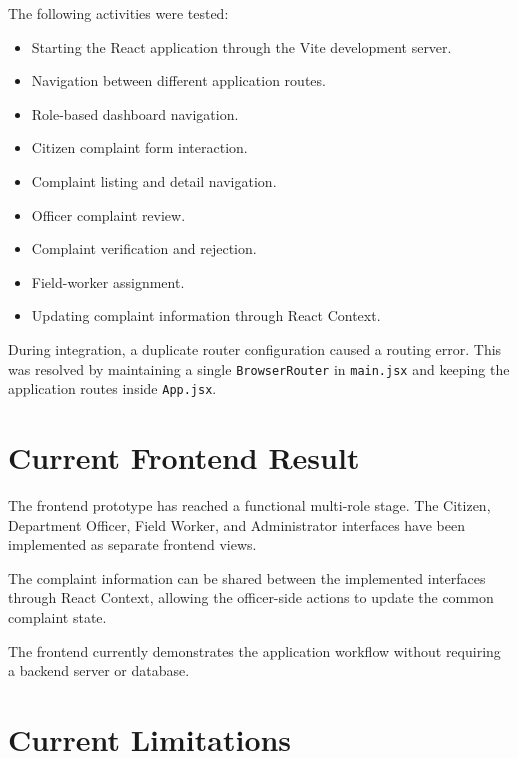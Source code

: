 \documentclass[12pt,a4paper]{article}
\begin{document}
The following activities were tested:

\begin{itemize}
    \item Starting the React application through the Vite development
    server.
    \item Navigation between different application routes.
    \item Role-based dashboard navigation.
    \item Citizen complaint form interaction.
    \item Complaint listing and detail navigation.
    \item Officer complaint review.
    \item Complaint verification and rejection.
    \item Field-worker assignment.
    \item Updating complaint information through React Context.
\end{itemize}

During integration, a duplicate router configuration caused a routing error.
This was resolved by maintaining a single \texttt{BrowserRouter} in
\texttt{main.jsx} and keeping the application routes inside \texttt{App.jsx}.

\section{Current Frontend Result}

The frontend prototype has reached a functional multi-role stage. The
Citizen, Department Officer, Field Worker, and Administrator interfaces have
been implemented as separate frontend views.

The complaint information can be shared between the implemented interfaces
through React Context, allowing the officer-side actions to update the
common complaint state.

The frontend currently demonstrates the application workflow without
requiring a backend server or database.

\section{Current Limitations}
\end{document}
